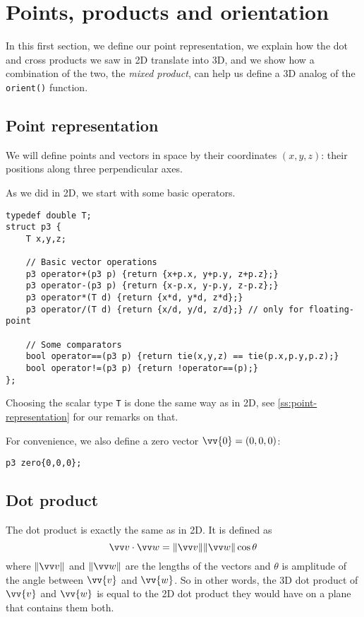 \section{Points, products and orientation}
In this first section, we define our point representation, we explain how the dot and cross products we saw in 2D translate into 3D, and we show how a combination of the two, the \emph{mixed product}, can help us define a 3D analog of the \lstinline|orient()| function.

\subsection{Point representation}
We will define points and vectors in space by their coordinates $(x,y,z)$: their positions along three perpendicular axes.


As we did in 2D, we start with some basic operators.
\begin{lstlisting}
typedef double T;
struct p3 {
    T x,y,z;
    
    // Basic vector operations
    p3 operator+(p3 p) {return {x+p.x, y+p.y, z+p.z};}
    p3 operator-(p3 p) {return {x-p.x, y-p.y, z-p.z};}
    p3 operator*(T d) {return {x*d, y*d, z*d};}
    p3 operator/(T d) {return {x/d, y/d, z/d};} // only for floating-point
    
    // Some comparators
    bool operator==(p3 p) {return tie(x,y,z) == tie(p.x,p.y,p.z);}
    bool operator!=(p3 p) {return !operator==(p);}
};
\end{lstlisting}
Choosing the scalar type \lstinline|T| is done the same way as in 2D, see \ref{ss:point-representation} for our remarks on that.

For convenience, we also define a zero vector $\vv{0}=(0,0,0)$:
\begin{lstlisting}
p3 zero{0,0,0};
\end{lstlisting}

\subsection{Dot product}
The dot product is exactly the same as in 2D. It is defined as \[\dotv{v}{w} = \normv{v}\normv{w} \cos\theta\] where $\normv{v}$ and $\normv{w}$ are the lengths of the vectors and $\theta$ is amplitude of the angle between $\vv{v}$ and $\vv{w}$.
So in other words, the 3D dot product of $\vv{v}$ and $\vv{w}$ is equal to the 2D dot product they would have on a plane that contains them both.

